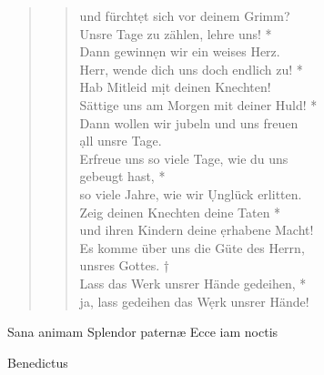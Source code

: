 \begin{quote}
\begin{verse}
\vin und fürcht\d et sich vor deinem Grimm? \\
Unsre Tage zu zählen, lehre uns! *\\
Dann gewinn\d en wir ein weises Herz.\\ 
\vin Herr, wende dich uns doch endlich zu! *\\
\vin Hab Mitleid m\d it deinen Knechten!\\
Sättige uns am Morgen mit deiner Huld! *\\
Dann wollen wir jubeln und uns freuen\\ \d all unsre Tage.\\ 
\vin Erfreue uns so viele Tage, wie du uns \\ \vin gebeugt hast, *\\
\vin so viele Jahre, wie wir \d Unglück erlitten.\\
Zeig deinen Knechten deine Taten *\\
und ihren Kindern deine \d erhabene Macht! \\
\vin Es komme über uns die Güte des Herrn, \\ \vin unsres Gottes. †\\
\vin Lass das Werk unsrer Hände gedeihen, *\\ \vin ja, lass gedeihen das W\d erk unsrer Hände!\\
\end{verse}

\end{quote}

\noindent{} Sana animam  Splendor paternæ  Ecce iam noctis \\
\begin{flushleft}


\medskip

{\rm{
}}
\end{flushleft}

\def\greinitialformat#1{{\fontsize{40}{40}\selectfont #1}}
\gresetfirstlineaboveinitial{\small \textcolor{red}{Benedic.}}{}
\setaboveinitialseparation{0.72mm}


 Benedictus 

